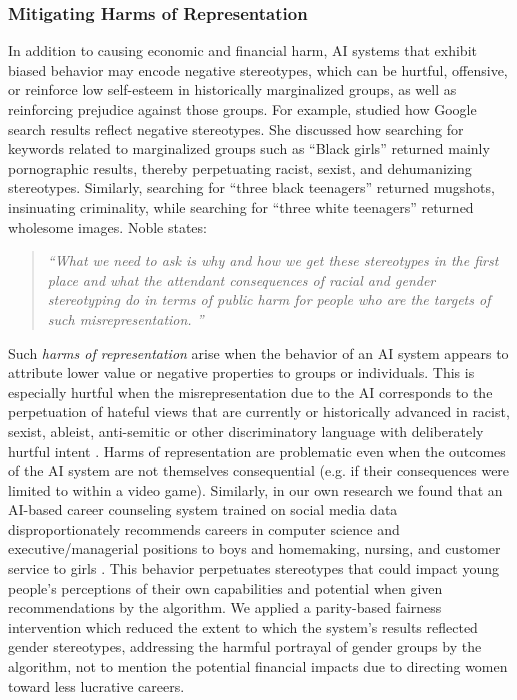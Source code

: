 \documentclass[11pt,dvipdfm]{article}
\begin{document}
\subsubsection{Mitigating Harms of Representation}
In addition to causing economic and financial harm, AI systems that exhibit biased behavior may encode negative stereotypes, which can be hurtful, offensive, or reinforce low self-esteem in historically marginalized groups, as well as reinforcing prejudice against those groups.  For example, \cite{noble2018algorithms} studied how Google search results reflect negative stereotypes.  She discussed how searching for keywords related to marginalized groups such as ``Black girls'' returned mainly pornographic results, thereby perpetuating racist, sexist, and dehumanizing stereotypes.  Similarly, searching for ``three black teenagers'' returned mugshots, insinuating criminality, while searching for ``three white teenagers'' returned wholesome images.    Noble states:
\begin{quote}
    \emph{``What we need to ask is why and how we get these stereotypes in the first place and what the attendant consequences of racial and gender stereotyping do in terms of public harm for people who are the targets of such misrepresentation. \cite{noble2018algorithms}''}
\end{quote}
Such \emph{harms of representation} arise when the behavior of an AI system appears to attribute lower value or negative properties to groups or individuals.  This is especially hurtful when the misrepresentation due to the AI corresponds to the perpetuation of hateful views that are currently or historically advanced in racist, sexist, ableist, anti-semitic or other discriminatory language with deliberately hurtful intent \cite{noble2018algorithms}.  Harms of representation are problematic even when the outcomes of the AI system are not themselves consequential (e.g. if their consequences were limited to within a video game).  Similarly, in our own research we found that an AI-based career counseling system trained on social media data disproportionately recommends careers in computer science and executive/managerial positions to boys and homemaking, nursing, and customer service to girls \cite{islam2020neural}.  This behavior perpetuates stereotypes that could impact young people's perceptions of their own capabilities and potential when given recommendations by the algorithm.  We applied a parity-based fairness intervention which reduced the extent to which the system's results reflected gender stereotypes, addressing the harmful portrayal of gender groups by the algorithm, not to mention the potential financial impacts due to directing women toward less lucrative careers. 
\end{document}
